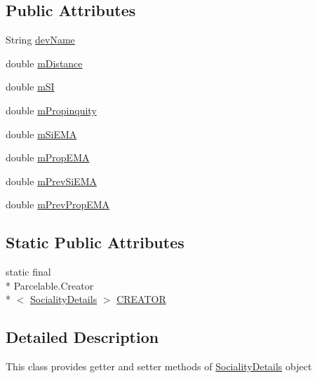\subsection*{Public Attributes}
\begin{DoxyCompactItemize}
\item 
String \hyperlink{classcs_1_1nsense_1_1inference_module_1_1_sociality_details_ad7aef6760e509ff3665fd7e47cf05aad}{dev\-Name}
\item 
double \hyperlink{classcs_1_1nsense_1_1inference_module_1_1_sociality_details_a0ec76e4ce159025388662ad6008c2a9e}{m\-Distance}
\item 
double \hyperlink{classcs_1_1nsense_1_1inference_module_1_1_sociality_details_a0a174fb0173d3bb05af5a224af0dc1e1}{m\-S\-I}
\item 
double \hyperlink{classcs_1_1nsense_1_1inference_module_1_1_sociality_details_af89d988e5ebf957e2fbdc430223bb670}{m\-Propinquity}
\item 
double \hyperlink{classcs_1_1nsense_1_1inference_module_1_1_sociality_details_a2174115bf6d09faef8cbbaca72bdd870}{m\-Si\-E\-M\-A}
\item 
double \hyperlink{classcs_1_1nsense_1_1inference_module_1_1_sociality_details_ad774c9e34300d93e24f485e907e92b9e}{m\-Prop\-E\-M\-A}
\item 
double \hyperlink{classcs_1_1nsense_1_1inference_module_1_1_sociality_details_acf0f989a385f0f400e31a4e26caa7bec}{m\-Prev\-Si\-E\-M\-A}
\item 
double \hyperlink{classcs_1_1nsense_1_1inference_module_1_1_sociality_details_a681b079820f25dddabda62d25e1f8cfe}{m\-Prev\-Prop\-E\-M\-A}
\end{DoxyCompactItemize}
\subsection*{Static Public Attributes}
\begin{DoxyCompactItemize}
\item 
static final \\*
Parcelable.\-Creator\\*
$<$ \hyperlink{classcs_1_1nsense_1_1inference_module_1_1_sociality_details}{Sociality\-Details} $>$ \hyperlink{classcs_1_1nsense_1_1inference_module_1_1_sociality_details_a6adfb65c097c1aa1a3ee42230c6879dd}{C\-R\-E\-A\-T\-O\-R}
\end{DoxyCompactItemize}


\subsection{Detailed Description}
This class provides getter and setter methods of \hyperlink{classcs_1_1nsense_1_1inference_module_1_1_sociality_details}{Sociality\-Details} object 

